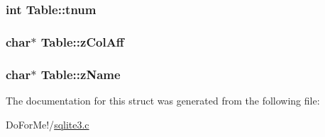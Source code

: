 \hypertarget{struct_table_aebe1abbfb2fd4b5e5dff8e74a4f3c890}{
\subsubsection[{tnum}]{\setlength{\rightskip}{0pt plus 5cm}int Table\-::tnum}}\label{struct_table_aebe1abbfb2fd4b5e5dff8e74a4f3c890}
\hypertarget{struct_table_ac95c0c7b04f2c8367beb98d386d4228f}{
\subsubsection[{z\-Col\-Aff}]{\setlength{\rightskip}{0pt plus 5cm}char$\ast$ Table\-::z\-Col\-Aff}}\label{struct_table_ac95c0c7b04f2c8367beb98d386d4228f}
\hypertarget{struct_table_a20ca62607d6da596b1016b76cf677809}{
\subsubsection[{z\-Name}]{\setlength{\rightskip}{0pt plus 5cm}char$\ast$ Table\-::z\-Name}}\label{struct_table_a20ca62607d6da596b1016b76cf677809}


The documentation for this struct was generated from the following file\-:\begin{DoxyCompactItemize}
\item 
Do\-For\-Me!/\hyperlink{sqlite3_8c}{sqlite3.\-c}\end{DoxyCompactItemize}
